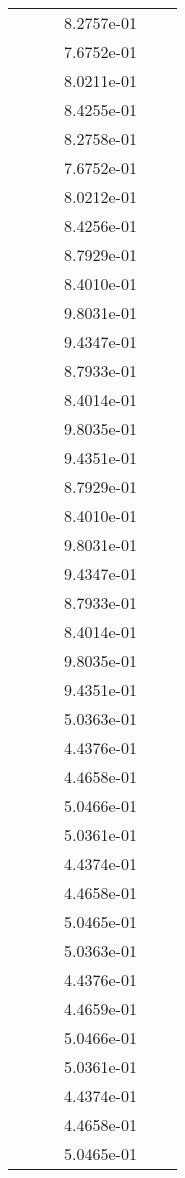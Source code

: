 \begin{xltabular}{\textwidth}{r|rS[table-format=1.3e+2]S[table-format=1.4e+2]S[table-format=1.4e+2]S[table-format=-1.5]}
&  &  & 8.2757e-01 & & \\
&  &  & 7.6752e-01 & & \\
&  &  & 8.0211e-01 & & \\
&  &  & 8.4255e-01 & & \\
&  &  & 8.2758e-01 & & \\
&  &  & 7.6752e-01 & & \\
&  &  & 8.0212e-01 & & \\
&  &  & 8.4256e-01 & & \\
&  &  & 8.7929e-01 & & \\
&  &  & 8.4010e-01 & & \\
&  &  & 9.8031e-01 & & \\
&  &  & 9.4347e-01 & & \\
&  &  & 8.7933e-01 & & \\
&  &  & 8.4014e-01 & & \\
&  &  & 9.8035e-01 & & \\
&  &  & 9.4351e-01 & & \\
&  &  & 8.7929e-01 & & \\
&  &  & 8.4010e-01 & & \\
&  &  & 9.8031e-01 & & \\
&  &  & 9.4347e-01 & & \\
&  &  & 8.7933e-01 & & \\
&  &  & 8.4014e-01 & & \\
&  &  & 9.8035e-01 & & \\
&  &  & 9.4351e-01 & & \\
&  &  & 5.0363e-01 & & \\
&  &  & 4.4376e-01 & & \\
&  &  & 4.4658e-01 & & \\
&  &  & 5.0466e-01 & & \\
&  &  & 5.0361e-01 & & \\
&  &  & 4.4374e-01 & & \\
&  &  & 4.4658e-01 & & \\
&  &  & 5.0465e-01 & & \\
&  &  & 5.0363e-01 & & \\
&  &  & 4.4376e-01 & & \\
&  &  & 4.4659e-01 & & \\
&  &  & 5.0466e-01 & & \\
&  &  & 5.0361e-01 & & \\
&  &  & 4.4374e-01 & & \\
&  &  & 4.4658e-01 & & \\
&  &  & 5.0465e-01 & & \\

\end{xltabular}
